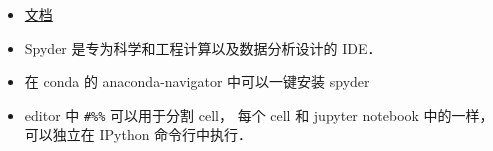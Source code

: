 
\begin{issues}
\issueDraft
\end{issues}

\begin{itemize}
\item \href{https://docs.spyder-ide.org/current/}{文档}
\item Spyder 是专为科学和工程计算以及数据分析设计的 IDE．
\item 在 conda 的 anaconda-navigator 中可以一键安装 spyder
\item editor 中 \verb|#%%| 可以用于分割 cell， 每个 cell 和 jupyter notebook 中的一样， 可以独立在 IPython 命令行中执行．
\end{itemize}
